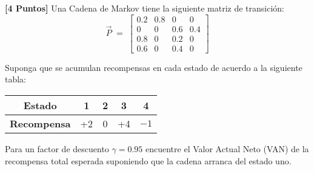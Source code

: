 \documentclass[ a4paper, twoside, 11pt]{article}
\begin{document}
\begin{problem}
\textbf{[4 Puntos]} Una Cadena de Markov tiene la siguiente matriz de transici\'on: 
\[
\vec{P} \; = \; \left[
\begin{array}{cccc}
0.2 & 0.8 & 0 & 0 \\
0 & 0 & 0.6 & 0.4 \\
0.8 & 0 & 0.2 & 0 \\
0.6 & 0 & 0.4 & 0
\end{array} \right]
\]

Suponga que se acumulan recompensas en cada estado de acuerdo a la siguiente tabla: 
\begin{table}[htb]
\centering
\begin{tabular}{|c|c|c|c|c|}
\hline
\textbf{Estado} & 1 & 2 & 3 & 4 \\ \hline
\textbf{Recompensa} & +2 & 0 & +4 & $-1$ \\ \hline
\end{tabular}
\end{table}

Para un factor de descuento $\gamma = 0.95$ encuentre el Valor Actual Neto (VAN) de la recompensa total esperada suponiendo que la cadena arranca del estado uno. 

\end{problem}
\vspace{\baselineskip}
\end{document}
